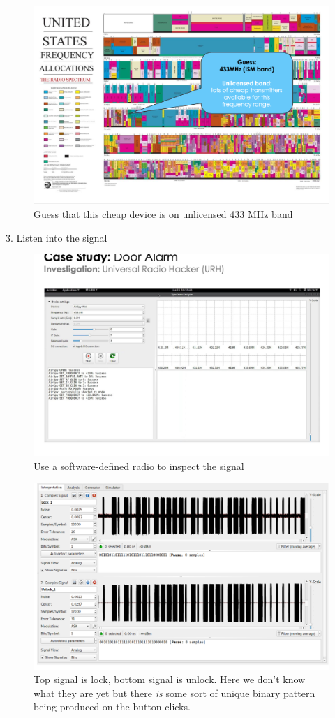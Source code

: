 \documentclass[../notes.tex]{subfiles}
\begin{document}
\begin{blockquote}
    \begin{figure}[H]
        \centering
        \includegraphics[width=0.8\linewidth]{img/image_2023-01-30-18-46-55.png}
        \caption{Guess that this cheap device is on unlicensed 433 MHz band}
    \end{figure}

    3. Listen into the signal

    \begin{figure}[H]
        \centering
        \includegraphics[width=0.8\linewidth]{img/image_2023-01-30-18-47-45.png}
        \caption{Use a software-defined radio to inspect the signal}
    \end{figure}

    \begin{figure}[H]
        \centering
        \includegraphics[width=0.8\linewidth]{img/image_2023-01-30-18-48-22.png}
        \caption{Top signal is lock, bottom signal is unlock. Here we don't know what they are yet but there \textit{is} some sort of unique binary pattern being produced on the button clicks.}
    \end{figure}


\end{blockquote}
\end{document}
